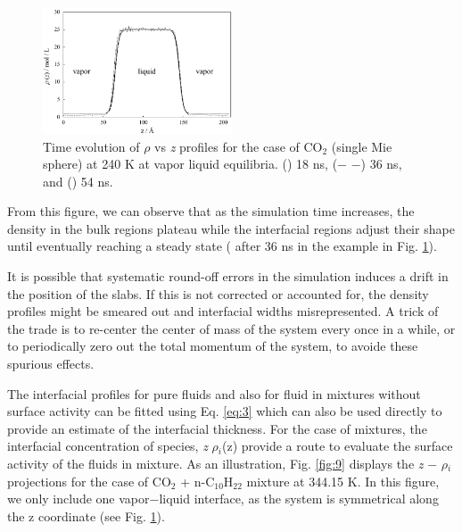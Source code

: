 \documentclass[9pt,bestpractices]{livecoms}
\begin{document}
\begin{figure}
\includegraphics[width=0.5\textwidth]{gfx/Fig_14_2.jpeg}
\caption{Time evolution of {${\rho}$} vs \textit{z} profiles for the case of CO$_{2}$ (single Mie sphere) at 240 K at vapor \textendash{} liquid equilibria. ({\textbullet}{\textbullet}{\textbullet}) 18 ns, (${-}$ ${-}$) 36 ns, and (\textemdash) 54 ns.}
\label{fig:8}
\end{figure}

From this figure, we can observe that as the simulation time increases, the
density in the bulk regions plateau while the interfacial regions adjust their
shape until eventually reaching a steady state ( after 36 ns in the example in
Fig. \ref{fig:8}). 

It is possible that systematic round-off errors in the simulation induces a drift
in the position of the slabs. If this is not corrected or accounted for, the
density profiles might be smeared out and interfacial widths misrepresented.
A trick of the trade is to re-center the center of mass of the system every
once in a while, or to periodically zero out the total momentum of the system,
to avoide these spurious effects.

The interfacial profiles for pure fluids and also for fluid in mixtures without
surface activity can be fitted using Eq. \ref{eq:3} which can also be used directly to
provide an estimate of the interfacial thickness. For the case of mixtures, the
interfacial concentration of species, \textit{z} \textendash{}
{${\rho}$}$_{i}$(z) provide a route to evaluate the surface activity of the
fluids in mixture. As an illustration, Fig. \ref{fig:9} displays the \textit{z} ${-}$
${\rho}$$_{i}$ projections for the case of CO$_{2}$ + n-C$_{10}$H$_{22}$
mixture at 344.15 K. In this figure, we only include one vapor${-}$liquid
interface, as the system is symmetrical along the z coordinate (see Fig. \ref{fig:8}). 
\end{document}
